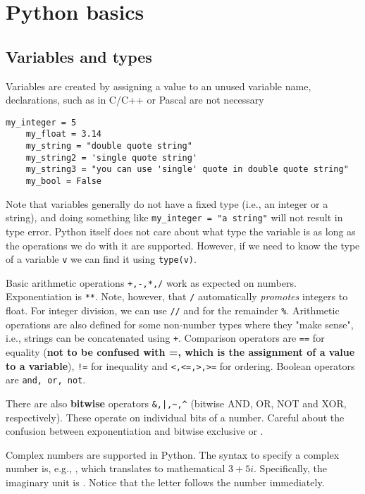 \newpage
\section{Python basics}

\subsection{Variables and types}

Variables are created by assigning a value to an unused variable name, declarations, such as in C/C++ or Pascal are not necessary
\begin{lstlisting}[caption=Defining variables]
    my_integer = 5
    my_float = 3.14
    my_string = "double quote string"
    my_string2 = 'single quote string'
    my_string3 = "you can use 'single' quote in double quote string"
    my_bool = False
\end{lstlisting}

Note that variables generally do not have a fixed type (i.e., an integer or a string), and doing something like \lstinline{my_integer = "a string"} will not result in type error. Python itself does not care about what type the variable is as long as the operations we do with it are supported. However, if we need to know the type of a variable \lstinline{v} we can find it using \lstinline{type(v)}.

Basic arithmetic operations \verb|+,-,*,/| work as expected on numbers. Exponentiation is \verb|**|. Note, however, that \verb|/| automatically \emph{promotes} integers to float. For integer division, we can use \verb|//| and for the remainder \verb|%|. Arithmetic operations are also defined for some non-number types where they "make sense", i.e., strings can be concatenated using \verb|+|. Comparison operators are \verb|==| for equality (\textbf{not to be confused with =, which is the assignment of a value to a variable}), \verb|!=| for inequality and \verb|<,<=,>,>=| for ordering. Boolean operators are \verb|and, or, not|. 

There are also \textbf{bitwise} operators \lstinline{&,|,~,^} (bitwise AND, OR, NOT and XOR, respectively). These operate on individual bits of a number. Careful about the confusion between exponentiation \ls{**} and bitwise exclusive or \ls{^}.

Complex numbers are supported in Python. The syntax to specify a complex number is, e.g., , which translates to mathematical $3 + 5i$. Specifically, the imaginary unit is . Notice that the letter  follows the number immediately.

